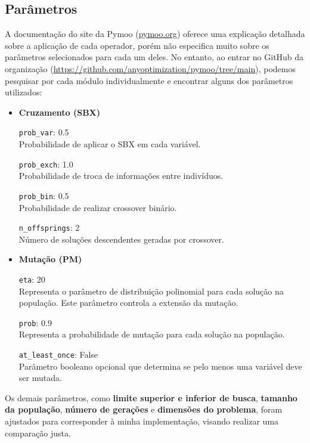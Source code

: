\documentclass{article}
\begin{document}
\subsection{Parâmetros}

A documentação do site da Pymoo (\url{pymoo.org}) oferece uma explicação detalhada sobre a aplicação de cada operador, porém não especifica muito sobre os parâmetros selecionados para cada um deles. No entanto, ao entrar no GitHub da organização (\url{https://github.com/anyoptimization/pymoo/tree/main}), podemos pesquisar por cada módulo individualmente e encontrar alguns dos parâmetros utilizados:


\begin{itemize}
    \item \textbf{Cruzamento (SBX)}

   
 \texttt{prob\_var}: 0.5 \\
        Probabilidade de aplicar o SBX em cada variável.
  
  \texttt{prob\_exch}: 1.0 \\
        Probabilidade de troca de informações entre indivíduos.
  
  \texttt{prob\_bin}: 0.5 \\
        Probabilidade de realizar crossover binário.
  
  \texttt{n\_offsprings}: 2 \\
        Número de soluções descendentes geradas por crossover.

  \item \textbf{Mutação (PM)}
  
     \texttt{eta}: 20\\
     Representa o parâmetro de distribuição polinomial para cada solução na população. Este parâmetro controla a extensão da mutação.
   
     \texttt{prob}: 0.9\\
     Representa a probabilidade de mutação para cada solução na população.
   
     \texttt{at\_least\_once}: False\\
     Parâmetro booleano opcional que determina se pelo menos uma variável deve ser mutada.
  
\end{itemize}

Os demais parâmetros, como \textbf{limite superior e inferior de busca}, \textbf{tamanho da população}, \textbf{número de gerações} e \textbf{dimensões do problema}, foram ajustados para corresponder à minha implementação, visando realizar uma comparação justa.
\end{document}

